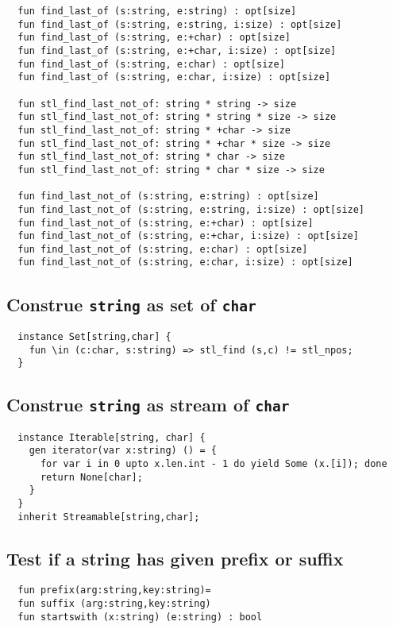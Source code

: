 \documentclass[oneside]{book}
\begin{document}
{\begin{verbatim}
  fun find_last_of (s:string, e:string) : opt[size]
  fun find_last_of (s:string, e:string, i:size) : opt[size]
  fun find_last_of (s:string, e:+char) : opt[size]
  fun find_last_of (s:string, e:+char, i:size) : opt[size]
  fun find_last_of (s:string, e:char) : opt[size]
  fun find_last_of (s:string, e:char, i:size) : opt[size]

  fun stl_find_last_not_of: string * string -> size
  fun stl_find_last_not_of: string * string * size -> size
  fun stl_find_last_not_of: string * +char -> size
  fun stl_find_last_not_of: string * +char * size -> size
  fun stl_find_last_not_of: string * char -> size
  fun stl_find_last_not_of: string * char * size -> size

  fun find_last_not_of (s:string, e:string) : opt[size]
  fun find_last_not_of (s:string, e:string, i:size) : opt[size]
  fun find_last_not_of (s:string, e:+char) : opt[size]
  fun find_last_not_of (s:string, e:+char, i:size) : opt[size]
  fun find_last_not_of (s:string, e:char) : opt[size]
  fun find_last_not_of (s:string, e:char, i:size) : opt[size]
\end{verbatim}

  
\subsection{Construe {\tt string} as set of {\tt char}}
\begin{verbatim}
  instance Set[string,char] {
    fun \in (c:char, s:string) => stl_find (s,c) != stl_npos;
  }
\end{verbatim}
  
\subsection{Construe {\tt string} as stream of {\tt char}}
\begin{verbatim}
  instance Iterable[string, char] {
    gen iterator(var x:string) () = {
      for var i in 0 upto x.len.int - 1 do yield Some (x.[i]); done
      return None[char];
    }
  }
  inherit Streamable[string,char];
\end{verbatim}

\subsection{Test if a string has given prefix or suffix}
\begin{verbatim}
  fun prefix(arg:string,key:string)=
  fun suffix (arg:string,key:string)
  fun startswith (x:string) (e:string) : bool


\end{verbatim}}
\end{document}
